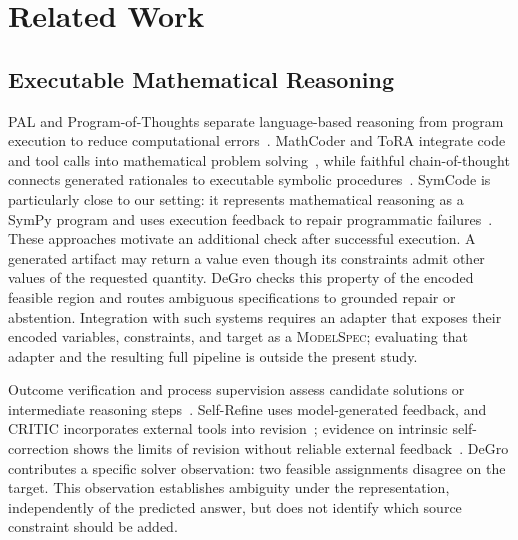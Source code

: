 \documentclass[sigconf,anonymous]{aamas}
\begin{document}
\section{Related Work}
\subsection{Executable Mathematical Reasoning}
PAL and Program-of-Thoughts separate language-based reasoning from program execution to reduce computational errors~\cite{gao2023pal,chen2023pot}.  MathCoder and ToRA integrate code and tool calls into mathematical problem solving~\cite{wang2024mathcoder,gou2024tora}, while faithful chain-of-thought connects generated rationales to executable symbolic procedures~\cite{lyu2023faithful}.  SymCode is particularly close to our setting: it represents mathematical reasoning as a SymPy program and uses execution feedback to repair programmatic failures~\cite{nezhad2026symcode}.  These approaches motivate an additional check after successful execution.  A generated artifact may return a value even though its constraints admit other values of the requested quantity.  DeGro checks this property of the encoded feasible region and routes ambiguous specifications to grounded repair or abstention.  Integration with such systems requires an adapter that exposes their encoded variables, constraints, and target as a \textsc{ModelSpec}; evaluating that adapter and the resulting full pipeline is outside the present study.

Outcome verification and process supervision assess candidate solutions or intermediate reasoning steps~\cite{cobbe2021verifiers,uesato2022feedback,lightman2023verify}.  Self-Refine uses model-generated feedback, and CRITIC incorporates external tools into revision~\cite{madaan2023selfrefine,gou2024critic}; evidence on intrinsic self-correction shows the limits of revision without reliable external feedback~\cite{huang2024selfcorrect}.  DeGro contributes a specific solver observation: two feasible assignments disagree on the target.  This observation establishes ambiguity under the representation, independently of the predicted answer, but does not identify which source constraint should be added.
\end{document}
